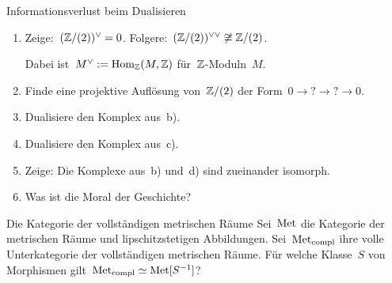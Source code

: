 \documentclass{uebblatt}
\begin{document}

\begin{aufgabe}{Informationsverlust beim Dualisieren}
\begin{enumerate}
\item Zeige:~$(\mathbb{Z}/(2))^\vee = 0$.
Folgere:~$(\mathbb{Z}/(2))^{\vee\vee} \not\cong \mathbb{Z}/(2)$.

Dabei ist~$M^\vee := \mathrm{Hom}_{\mathbb{Z}}(M,\mathbb{Z})$ für~$\mathbb{Z}$-Moduln~$M$.
\item Finde eine projektive Auflösung von~$\mathbb{Z}/(2)$ der Form~$0 \to {?} \to {?} \to
0$.
\item Dualisiere den Komplex aus~b).
\item Dualisiere den Komplex aus~c).
\item Zeige: Die Komplexe aus~b) und~d) sind zueinander isomorph.
\item Was ist die Moral der Geschichte?
\end{enumerate}
\end{aufgabe}

\begin{aufgabe}{Die Kategorie der vollständigen metrischen Räume}
Sei~$\mathrm{Met}$ die Kategorie der metrischen Räume und lipschitzstetigen
Abbildungen. Sei~$\mathrm{Met}_\mathrm{compl}$ ihre volle Unterkategorie der
vollständigen metrischen Räume. Für welche Klasse~$S$ von Morphismen
gilt~$\mathrm{Met}_\mathrm{compl} \simeq \mathrm{Met}[S^{-1}]$?

\end{aufgabe}

\end{document}
